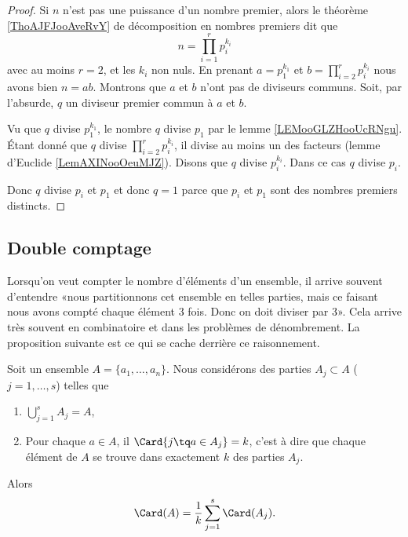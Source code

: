\begin{proof}
	Si \( n\) n'est pas une puissance d'un nombre premier, alors le théorème \ref{ThoAJFJooAveRvY} de décomposition en nombres premiers dit que
	\begin{equation}
		n=\prod_{i=1}^rp_i^{k_i}
	\end{equation}
	avec au moins \( r=2\), et les \( k_i\) non nuls. En prenant \( a=p_1^{k_1}\) et \( b=\prod_{i=2}^rp_i^{k_i}\) nous avons bien \( n=ab\). Montrons que \( a\) et \( b\) n'ont pas de diviseurs communs. Soit, par l'absurde, \( q\) un diviseur premier commun à \( a\) et \( b\).

	Vu que \( q\) divise \( p_1^{k_1}\), le nombre \( q\) divise \( p_1\) par le lemme \ref{LEMooGLZHooUcRNgu}. Étant donné que \( q\) divise \( \prod_{i=2}^rp_i^{k_i}\), il divise au moins un des facteurs (lemme d'Euclide \ref{LemAXINooOeuMJZ}). Disons que \( q\) divise \( p_i^{k_i}\). Dans ce cas \( q\) divise \( p_i\).

	Donc \( q\) divise \( p_i\) et \( p_1\) et donc \( q=1\) parce que \( p_i\) et \( p_1\) sont des nombres premiers distincts.
\end{proof}

\subsection{Double comptage}

Lorsqu'on veut compter le nombre d'éléments d'un ensemble, il arrive souvent d'entendre «nous partitionnons cet ensemble en telles parties, mais ce faisant nous avons compté chaque élément 3 fois. Donc on doit diviser par 3». Cela arrive très souvent en combinatoire et dans les problèmes de dénombrement. La proposition suivante est ce qui se cache derrière ce raisonnement.

\begin{proposition}	\label{PROPooURPFooYSdyKW}
	Soit un ensemble \( A=\{ a_1,\ldots,a_n \}\). Nous considérons des parties \( A_j\subset A\) (\( j=1,\ldots,s\)) telles que
	\begin{enumerate}
		\item
		      \( \bigcup_{j=1}^sA_j=A\),
		\item
		      Pour chaque \( a\in A\), il \( \Card\{ j\tq a\in A_j \}=k\), c'est à dire que chaque élément de \( A\) se trouve dans exactement \( k\) des parties \( A_j\).
	\end{enumerate}
	Alors
	\begin{equation}
		\Card(A)=\frac{1}{ k}\sum_{j=1}^s\Card(A_j).
	\end{equation}
\end{proposition}

